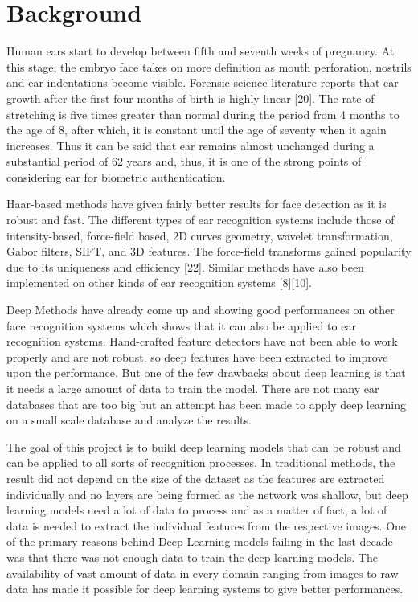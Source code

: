 \chapter{Background}
\label{sec:back}

Human ears start to develop between fifth and seventh weeks of pregnancy. At this stage, the embryo face takes on more definition as mouth perforation, nostrils and ear indentations become visible. Forensic science literature reports that ear growth after the first four months of birth is highly linear [20]. The rate of stretching is five times greater than normal during the period from 4 months to the age of 8, after which, it is constant until the age of seventy when it again increases. Thus it can be said that ear remains almost unchanged during a substantial period of 62 years and, thus, it is one of the strong points of considering ear for biometric authentication.

Haar-based methods have given fairly better results for face detection as it is robust and fast. The different types of ear recognition systems include those of intensity-based, force-field based, 2D curves geometry, wavelet transformation, Gabor filters, SIFT, and 3D features. The force-field transforms gained popularity due to its uniqueness and efficiency [22]. Similar methods have also been implemented on other kinds of ear recognition systems [8][10].

Deep Methods have already come up and showing good performances on other face recognition systems which shows that it can also be applied to ear recognition systems. Hand-crafted feature detectors have not been able to work properly and are not robust, so deep features have been extracted to improve upon the performance. But one of the few drawbacks about deep learning is that it needs a large amount of data to train the model. There are not many ear databases that are too big but an attempt has been made to apply deep learning on a small scale database and analyze the results.

The goal of this project is to build deep learning models that can be robust and can be applied to all sorts of recognition processes. In traditional methods, the result did not depend on the size of the dataset as the features are extracted individually and no layers are being formed as the network was shallow, but deep learning models need a lot of data to process and as a matter of fact, a lot of data is needed to extract the individual features from the respective images. One of the primary reasons behind Deep Learning models failing in the last decade was that there was not enough data to train the deep learning models. The availability of vast amount of data in every domain ranging from images to raw data has made it possible for deep learning systems to give better performances.

